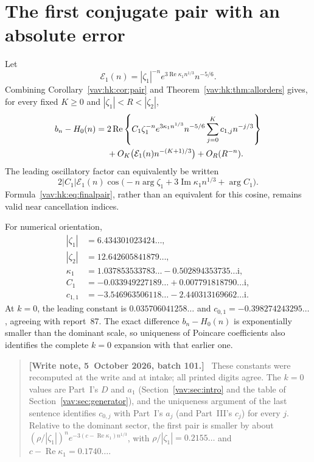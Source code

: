 \documentclass[11pt]{article}
\theoremstyle{remark}\newtheorem{remark}[theorem]{Remark}
\newcommand{\ii}{\mathrm i}
\newenvironment{writenoteb}{\begin{quote}\small\raggedright\textbf{[Write note, 5~October 2026, batch 101.]}\ }{\end{quote}}
\newcommand{\Rea}{\operatorname{Re}}
\newcommand{\Ima}{\operatorname{Im}}
\begin{document}
\section{The first conjugate pair with an absolute error}\label{vav:hk:sec:pair}
Let
\[
 \mathcal E_1(n)=|\zeta_1|^{-n}
 e^{3\Rea\kappa_1 n^{1/3}}n^{-5/6}.
\]
Combining Corollary~\ref{vav:hk:cor:pair} and Theorem~\ref{vav:hk:thm:allorders} gives, for every fixed $K\geq0$ and $|\zeta_1|<R<|\zeta_2|$,
\begin{align}\label{vav:hk:eq:finalpair}
 b_n-H_0(n)
 ={}&2\Rea\left\{C_1\zeta_1^{-n}e^{3\kappa_1n^{1/3}}n^{-5/6}
       \sum_{j=0}^Kc_{1,j}n^{-j/3}\right\}\notag\\
 &+O_K\bigl(\mathcal E_1(n)n^{-(K+1)/3}\bigr)+O_R(R^{-n}).
\end{align}
The leading oscillatory factor can equivalently be written
\[
 2|C_1|\mathcal E_1(n)
 \cos\bigl(-n\arg\zeta_1+3\Ima\kappa_1n^{1/3}+\arg C_1\bigr).
\]
Formula~\eqref{vav:hk:eq:finalpair}, rather than an equivalent for this cosine, remains valid near cancellation indices.

For numerical orientation,
\begin{align*}
 |\zeta_1|&=6.434301023424\ldots,\\
 |\zeta_2|&=12.642605841879\ldots,\\
 \kappa_1&=1.037853533783\ldots
            -0.502894353735\ldots\ii,\\
 C_1&=-0.033949227189\ldots
            +0.007791818790\ldots\ii,\\
 c_{1,1}&=-3.546963506118\ldots
            -2.440313169662\ldots\ii.
\end{align*}
At $k=0$, the leading constant is $0.035706041258\ldots$ and $c_{0,1}=-0.398274243295\ldots$, agreeing with report~87. The exact difference $b_n-H_0(n)$ is exponentially smaller than the dominant scale, so uniqueness of Poincare coefficients also identifies the complete $k=0$ expansion with that earlier one.
\begin{writenoteb}
These constants were recomputed at the write and at intake; all printed
digits agree. The $k=0$ values are Part~I's $D$ and $a_1$
(Section~\ref{vav:sec:intro} and the table of Section~\ref{vav:sec:generator}),
and the uniqueness argument of the last sentence identifies $c_{0,j}$ with
Part~I's $a_j$ (and Part~III's $c_j$) for every $j$. Relative to the dominant
sector, the first pair is smaller by about
$(\rho/|\zeta_1|)^n e^{-3(c-\Rea\kappa_1)n^{1/3}}$, with
$\rho/|\zeta_1|=0.2155\ldots$ and $c-\Rea\kappa_1=0.1740\ldots$.
\end{writenoteb}
\end{document}
